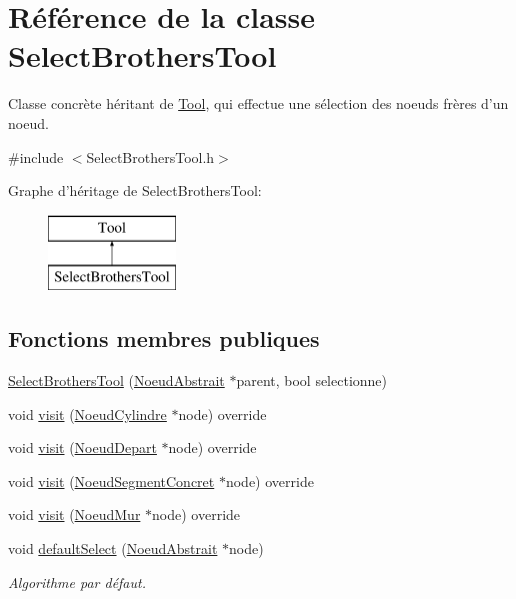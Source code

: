 \hypertarget{class_select_brothers_tool}{\section{Référence de la classe Select\-Brothers\-Tool}
\label{class_select_brothers_tool}
}


Classe concrète héritant de \hyperlink{class_tool}{Tool}, qui effectue une sélection des noeuds frères d'un noeud.  




{\ttfamily \#include $<$Select\-Brothers\-Tool.\-h$>$}

Graphe d'héritage de Select\-Brothers\-Tool\-:\begin{figure}[H]
\begin{center}
\leavevmode
\includegraphics[height=2.000000cm]{class_select_brothers_tool}
\end{center}
\end{figure}
\subsection*{Fonctions membres publiques}
\begin{DoxyCompactItemize}
\item 
\hyperlink{group__inf2990_gaa7c8bdba711edc6d4817c02c19f3dbe0}{Select\-Brothers\-Tool} (\hyperlink{class_noeud_abstrait}{Noeud\-Abstrait} $\ast$parent, bool selectionne)
\item 
void \hyperlink{group__inf2990_ga107677b2987385a2604f9c3ec11670b6}{visit} (\hyperlink{class_noeud_cylindre}{Noeud\-Cylindre} $\ast$node) override
\item 
void \hyperlink{group__inf2990_gac19bea128f3c4fb5084a44c761482ec9}{visit} (\hyperlink{class_noeud_depart}{Noeud\-Depart} $\ast$node) override
\item 
void \hyperlink{group__inf2990_gaf85983eda4fdee6755880c48d5acef1e}{visit} (\hyperlink{class_noeud_segment_concret}{Noeud\-Segment\-Concret} $\ast$node) override
\item 
void \hyperlink{group__inf2990_gaa9bd4b29b9f7865ac1903de6b6e5a0ca}{visit} (\hyperlink{class_noeud_mur}{Noeud\-Mur} $\ast$node) override
\item 
void \hyperlink{group__inf2990_ga53a73bc192206845143b838a267a7a3e}{default\-Select} (\hyperlink{class_noeud_abstrait}{Noeud\-Abstrait} $\ast$node)
\begin{DoxyCompactList}\small\item\em Algorithme par défaut. \end{DoxyCompactList}\end{DoxyCompactItemize}


